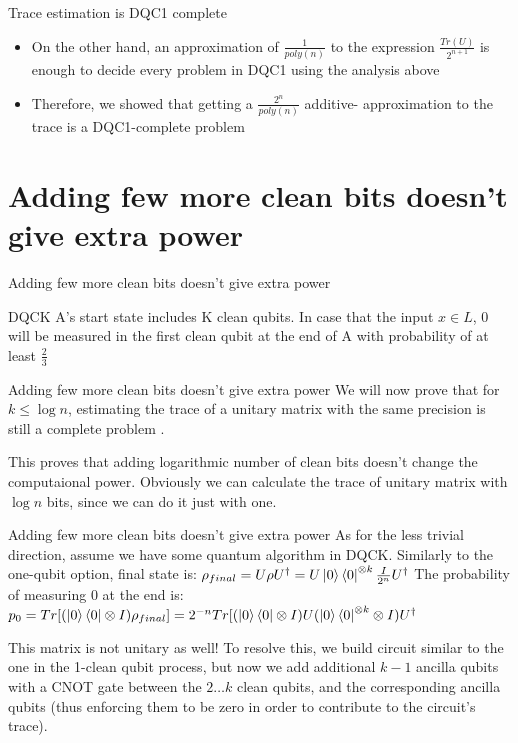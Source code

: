\documentclass[leqno,fleqn]{beamer}
\begin{document}
\begin{frame}[label={sec:orgheadline19}]{Trace estimation is DQC1 complete}
\begin{itemize}
\item On the other hand, an approximation of \(\frac{1}{poly(n)}\) to the
expression \(\frac{Tr(U)}{2^{n+1}}\) is enough to decide every problem
in DQC1 using the analysis above
\item Therefore, we showed that getting a \(\frac{2^{n}}{poly(n)}\) additive-
approximation to the trace is a DQC1-complete problem
\end{itemize}
\end{frame}
\section{Adding few more clean bits doesn't give extra power}
\label{sec:orgheadline25}
\begin{frame}[label={sec:orgheadline21}]{Adding few more clean bits doesn't give extra power}
\begin{block}{DQCK}
A's start state includes K clean qubits. In case that the input \(x \in L\), 0 will be measured in the first clean qubit at the end of A with probability of at least \(\frac{2}{3}\)
\end{block}
\end{frame}
\begin{frame}[label={sec:orgheadline22}]{Adding few more clean bits doesn't give extra power}
We will now prove that for \(k \leq \log{n}\), estimating the trace of a unitary matrix with the same precision is still a complete problem \cite{shor2008estimating}.

This proves that adding logarithmic number of clean bits doesn't change the computaional power.
Obviously we can calculate the trace of unitary matrix with \(\log{n}\) bits, since we can do it just with one. 
\end{frame}
\begin{frame}[label={sec:orgheadline23}]{Adding few more clean bits doesn't give extra power}
As for the less trivial direction, assume we have some quantum algorithm in DQCK.
Similarly to the one-qubit option, final state is:
\(\rho_{final} = U \rho U^\dagger = U\left\vert{0}\right\rangle\left\langle{0}\right\vert^{\otimes k}\frac{I}{2^n}U^\dagger\)
The probability of measuring 0 at the end is:
\(p_{0} = Tr[(\left\vert{0}\right\rangle\left\langle{0}\right\vert \otimes I)\rho_{final}] = 2^{-n}Tr[(\left\vert{0}\right\rangle\left\langle{0}\right\vert\otimes I)U(\left\vert{0}\right\rangle\left\langle{0}\right\vert^{\otimes k }\otimes I)U^\dagger\)

This matrix is not unitary as well!
To resolve this, we build circuit similar to the one in the 1-clean qubit process,
but now we add additional \(k-1\) ancilla qubits with a CNOT gate between the \(2 \dots k\) clean qubits, and the corresponding ancilla qubits (thus enforcing them to be zero in order to contribute to the circuit's trace).
\end{frame}
\end{document}
